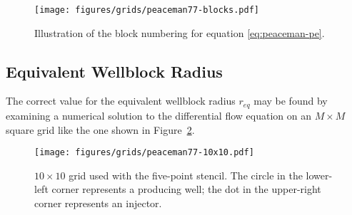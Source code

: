 \begin{figure}[htbp]
    \centering
    \texttt{[image: figures/grids/peaceman77-blocks.pdf]}
    \caption{Illustration of the block numbering for equation \eqref{eq:peaceman-pe}.}
    \label{fig:peaceman-block-numbering}
\end{figure}





\subsection{Equivalent Wellblock Radius} %
\label{sub:equivalent_wellblock_radius}
The correct value for the equivalent wellblock radius $r_{eq}$ may be found by examining a numerical solution to the differential flow equation on an $M\times M$ square grid like the one shown in Figure~\ref{fig:peaceman-grid}.

\begin{figure}[htbp]
    \centering
    \texttt{[image: figures/grids/peaceman77-10x10.pdf]}
    \caption{$10\times 10$ grid used with the five-point stencil. The circle in the lower-left corner represents a producing well; the dot in the upper-right corner represents an injector.}
    \label{fig:peaceman-grid}
\end{figure}



